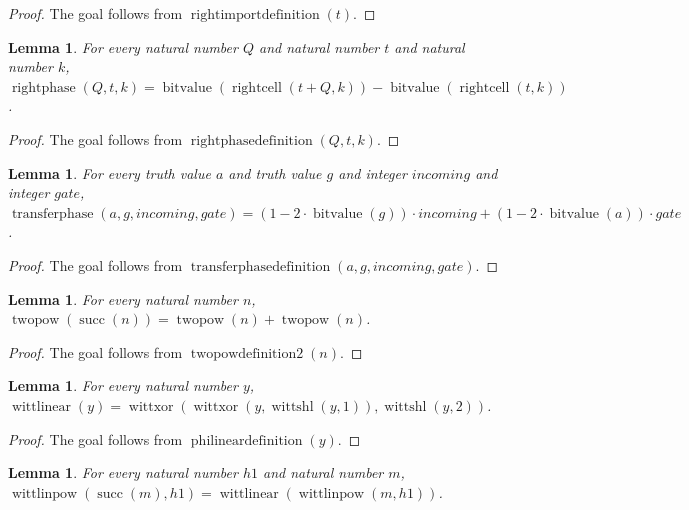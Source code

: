 \documentclass[11pt]{article}
\newtheorem{lemma}[theorem]{Lemma}
\theoremstyle{definition}
\begin{document}
\begin{proof}
The goal follows from \(\operatorname{rightimportdefinition}(t)\).
\end{proof}
\begin{lemma}
\label{ll:observations:right-phase-definition}
For every natural number \(Q\) and natural number \(t\) and natural number \(k\), \(\operatorname{rightphase}(Q, t, k) = \operatorname{bitvalue}(\operatorname{rightcell}(t + Q, k)) - \operatorname{bitvalue}(\operatorname{rightcell}(t, k))\).
\end{lemma}
\begin{proof}
The goal follows from \(\operatorname{rightphasedefinition}(Q, t, k)\).
\end{proof}
\begin{lemma}
\label{ll:observations:transfer-phase-definition}
For every truth value \(a\) and truth value \(g\) and integer \(incoming\) and integer \(gate\), \(\operatorname{transferphase}(a, g, incoming, gate) = (1 - 2 \cdot \operatorname{bitvalue}(g)) \cdot incoming + (1 - 2 \cdot \operatorname{bitvalue}(a)) \cdot gate\).
\end{lemma}
\begin{proof}
The goal follows from \(\operatorname{transferphasedefinition}(a, g, incoming, gate)\).
\end{proof}
\begin{lemma}
\label{ll:observations:twopow-definition-2}
For every natural number \(n\), \(\operatorname{twopow}(\operatorname{succ}(n)) = \operatorname{twopow}(n) + \operatorname{twopow}(n)\).
\end{lemma}
\begin{proof}
The goal follows from \(\operatorname{twopowdefinition2}(n)\).
\end{proof}
\begin{lemma}
\label{ll:observations:phi-linear-definition}
For every natural number \(y\), \(\operatorname{wittlinear}(y) = \operatorname{wittxor}(\operatorname{wittxor}(y, \operatorname{wittshl}(y, 1)), \operatorname{wittshl}(y, 2))\).
\end{lemma}
\begin{proof}
The goal follows from \(\operatorname{philineardefinition}(y)\).
\end{proof}
\begin{lemma}
\label{ll:observations:phi-linear-pow-definition-2}
For every natural number \(h1\) and natural number \(m\), \(\operatorname{wittlinpow}(\operatorname{succ}(m), h1) = \operatorname{wittlinear}(\operatorname{wittlinpow}(m, h1))\).
\end{lemma}
\end{document}
